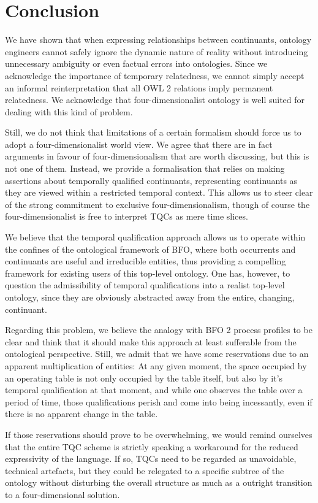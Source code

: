 \documentclass{ao2e}
\begin{document}
\section{Conclusion}
We have shown that when expressing relationships between continuants, ontology
engineers cannot safely ignore the dynamic nature of reality without introducing
unnecessary ambiguity or even factual errors into ontologies. Since we
acknowledge the importance of temporary relatedness, we cannot simply accept an
informal reinterpretation that all OWL 2 relations imply permanent relatedness. 
We acknowledge that four-dimensionalist ontology is well suited for
dealing with this kind of problem. 

Still, we do not think that limitations of a certain formalism should force us
to adopt a four-dimensionalist world view. We agree that there are in fact
arguments in favour of four-dimensionalism that are worth discussing, but this is not one of them. 
Instead, we provide a formalisation that relies on making assertions about
temporally qualified continuants, representing continuants as they are viewed
within a restricted temporal context. This allows us to steer clear of the strong
commitment to exclusive four-dimensionalism, though of course the
four-dimensionalist is free to interpret TQCs as mere time slices.

We believe that the temporal qualification approach allows us to operate within
the confines of the ontological framework of BFO, where both occurrents and
continuants are useful and irreducible entities, thus providing a compelling
framework for existing users of this top-level ontology. One has, however, to
question the admissibility of temporal qualifications into a
realist top-level ontology, since they are obviously abstracted away from the
entire, changing, continuant. 

Regarding this problem, we believe the analogy with BFO 2 process profiles to be
clear and think that it should make this approach at least sufferable from the
ontological perspective. Still, we admit that we have some reservations due to
an apparent multiplication of entities: At any given moment, the space occupied
by an operating table is not only occupied by the table itself, but also by it's
temporal qualification at that moment, and while one observes the table over a
period of time, those qualifications perish and come
into being incessantly, even if there is no apparent change in the table.  

If those reservations should prove to be overwhelming, we would remind ourselves
that the entire TQC scheme is strictly speaking a workaround for the reduced
expressivity of the language. If so, TQCs  need to be regarded as
unavoidable, technical artefacts, but they could be relegated to a specific
subtree of the ontology without disturbing the overall structure as much as a
outright transition to a four-dimensional solution.
\end{document}
